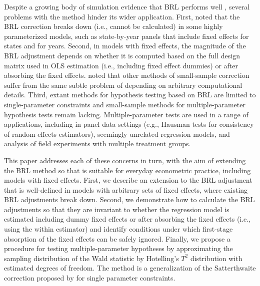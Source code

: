 \documentclass[12pt]{article}\usepackage[]{graphicx}\usepackage[]{color}
\begin{document}
Despite a growing body of simulation evidence that BRL performs well \citep[e.g.,][]{Imbens2015robust}, several problems with the method hinder its wider application. 
First, \citet{Angrist2009mostly} noted that the BRL correction breaks down (i.e., cannot be calculated) in some highly parameterized models, such as state-by-year panels that include fixed effects for states and for years.
Second, in models with fixed effects, the magnitude of the BRL adjustment depends on whether it is computed based on the full design matrix used in OLS estimation (i.e., including fixed effect dummies) or after absorbing the fixed effects. 
\citet{Cameron2015practitioners} noted that other methods of small-sample correction suffer from the same subtle problem of depending on arbitrary computational details.  
Third, extant methods for hypothesis testing based on BRL are limited to single-parameter constraints \citep{Bell2002bias, McCaffrey2006improved} and small-sample methods for multiple-parameter hypothesis tests remain lacking.
Multiple-parameter tests are used in a range of applications, including in panel data settings (e.g., Hausman tests for consistency of random effects estimators), seemingly unrelated regression models, and analysis of field experiments with multiple treatment groups.

This paper addresses each of these concerns in turn, with the aim of extending the BRL method so that is suitable for everyday econometric practice, including models with fixed effects. 
First, we describe an extension to the BRL adjustment that is well-defined in models with arbitrary sets of fixed effects, where existing BRL adjustments break down. 
Second, we demonstrate how to calculate the BRL adjustments so that they are invariant to whether the regression model is estimated including dummy fixed effects or after absorbing the fixed effects (i.e., using the within estimator) and identify conditions under which first-stage absorption of the fixed effects can be safely ignored. 
Finally, we propose a procedure for testing multiple-parameter hypotheses by approximating the sampling distribution of the Wald statistic by Hotelling's $T^2$ distribution with estimated degrees of freedom. The method is a generalization of the Satterthwaite correction proposed by \citet{Bell2002bias} for single parameter constraints.
\end{document}
